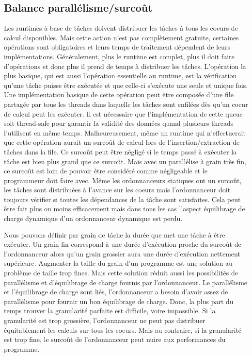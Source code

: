 \subsection{Balance parallélisme/surcoût}
Les runtimes à base de tâches doivent distribuer les tâches à tous les coeurs de calcul disponibles.
%
Mais cette action n'est pas complètement gratuite, certaines opérations sont obligatoires et leurs temps de traitement dépendent de leurs implémentations.
%
Généralement, plus le runtime est complet, plus il doit faire d'opérations et donc plus il prend de temps à distribuer les tâches.
%
L'opération la plus basique, qui est aussi l'opération essentielle au runtime, est la vérification qu'une tâche puisse être exécutée et que celle-ci s'exécute une seule et unique fois.
%
Une implémentation basique de cette opération peut être composée d'une file partagée par tous les threads dans laquelle les tâches sont enfilées dès qu'un coeur de calcul peut les exécuter.
%
Il est nécessaire que l'implémentation de cette queue soit thread-safe pour garantir la validité des données quand plusieurs threads l'utilisent en même temps.
%
Malheureusement, même un runtime qui n'effectuerait que cette opération aurait un surcoût de calcul lors de l'insertion/extraction de tâches dans la file.
%
Ce surcoût peut être négligé si le temps passé à exécuter la tâche est bien plus grand que ce surcoût.
%
Mais avec un parallélise à grain très fin, ce surcoût est loin de pouvoir être considéré comme négligeable et le programmeur doit faire avec.
%
Même les ordonnanceurs statiques ont un surcoût, les tâches sont distribuées à l'avance sur les coeurs mais l'ordonnanceur doit toujours vérifier si toutes les dépendances de la tâche sont satisfaites.
%
Cela peut être fait plus ou moins efficacement mais dans tous les cas l'aspect équilibrage de charge dynamique d'un ordonnanceur dynamique est perdu.


Nous pouvons définir par grain de tâche la durée que met une tâche à être exécuter.
%
Un grain fin correspond à une durée d'exécution proche du surcoût de l'ordonnanceur alors qu'un grain grossier aura une durée d'exécution nettement supérieure.
%
Augmenter la taille du grain d'un programme est une solution au problème de taille trop fines.
%
Mais cette solution réduit aussi les possibilités de parallélisme et d'équilibrage de charge fournis par l'ordonnanceur.
%
Le parallélisme et l'équilibrage de charge sont liés, l'ordonnanceur a besoin d'avoir assez de parallélisme pour fournir un bon équilibrage de charge.
%
Donc, la plus part du temps trouver la granularité parfaite est difficile, voire impossible.
%
Si la granularité est trop grossière, l'ordonnanceur ne peut pas distribuer équitablement les calculs sur tous les coeurs.
%
Mais au contraire, si la granularité est trop fine, le surcoût de l'ordonnanceur peut nuire aux performances du programme.


